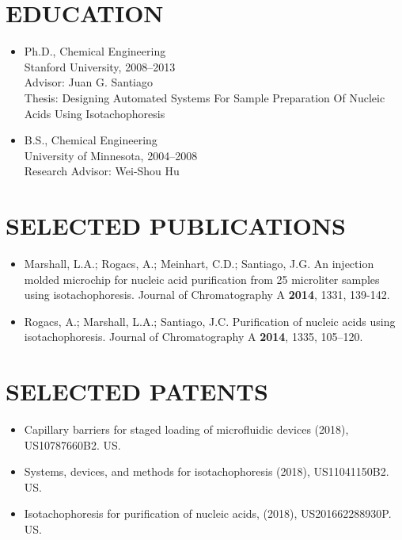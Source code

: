 \documentclass{res}
\begin{document}
\begin{resume}


\section{EDUCATION}
    \begin{itemize}
  		\item{Ph.D., Chemical Engineering}\\
		  Stanford University, 2008--2013 \\
  		Advisor: Juan G. Santiago\\
      Thesis: Designing Automated Systems For Sample Preparation Of Nucleic Acids Using Isotachophoresis
  	  \item{B.S., Chemical Engineering}\\
		  University of Minnesota, 2004--2008 \\
      Research Advisor: Wei-Shou Hu
    \end{itemize}

 \section{SELECTED PUBLICATIONS}
  \begin{itemize}
  \item Marshall, L.A.; Rogacs, A.; Meinhart, C.D.; Santiago, J.G. An injection molded microchip for nucleic acid purification from 25 microliter samples using isotachophoresis. Journal of Chromatography A \textbf{2014}, 1331, 139-142.
  \item Rogacs, A.; Marshall, L.A.; Santiago, J.C. Purification of nucleic acids using isotachophoresis. Journal of Chromatography A \textbf{2014}, 1335, 105–120.
\end{itemize}

 \section{SELECTED PATENTS}
   \begin{itemize}
    \item Capillary barriers for staged loading of microfluidic devices (2018), US10787660B2. US.  
    \item Systems, devices, and methods for isotachophoresis (2018), US11041150B2. US.
    \item Isotachophoresis for purification of nucleic acids, (2018), US201662288930P. US. 
   \end{itemize}



\end{resume}
\end{document}
